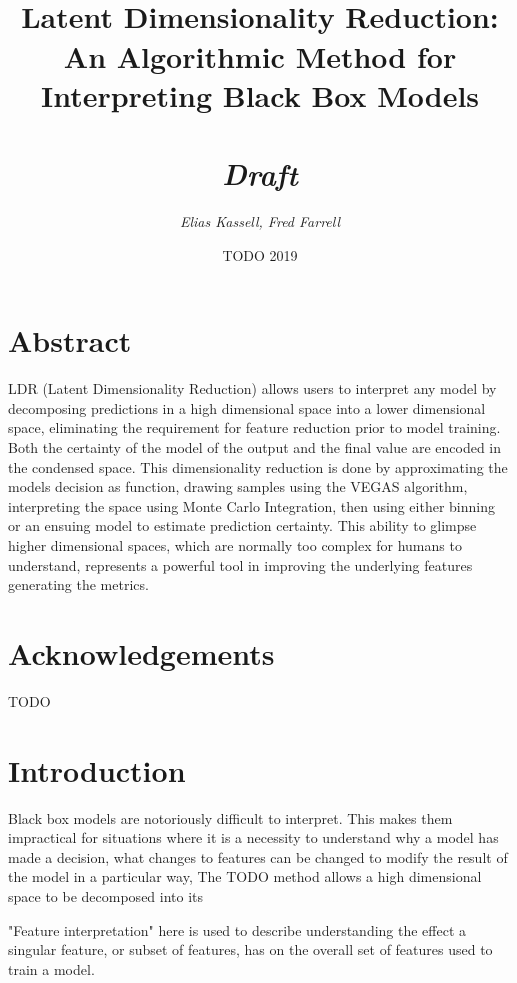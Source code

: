 \documentclass[a4paperpaper,twocolumn]{article}
\begin{document}
\title{\huge \\Latent Dimensionality Reduction: An Algorithmic Method for Interpreting Black Box Models\\~\\
\Large \emph{Draft}}
\author{\emph{Elias Kassell, Fred Farrell}}
\date{TODO 2019}
\maketitle

\section{Abstract}\label{abstract}

LDR (Latent Dimensionality Reduction) allows users to interpret any model by decomposing predictions in a high dimensional space into a lower dimensional space, eliminating the requirement for feature reduction prior to model training. Both the certainty of the model of the output and the final value are encoded in the condensed space. This dimensionality reduction is done by approximating the models decision as function, drawing samples using the VEGAS algorithm, interpreting the space using Monte Carlo Integration, then using either binning or an ensuing model to estimate prediction certainty. This ability to glimpse higher dimensional spaces, which are normally too complex for humans to understand, represents a powerful tool in improving the underlying features generating the metrics.

\section*{Acknowledgements}

TODO

\section{Introduction}\label{Introduction}

Black box models are notoriously difficult to interpret. This makes them impractical for situations where it is a necessity to understand why a model has made a decision, what changes to features can be changed to modify the result of the model in a particular way,  The TODO method allows a high dimensional space to be decomposed into its 

"Feature interpretation" here is used to describe understanding the effect a singular feature, or subset of features, has on the overall set of features used to train a model.
\end{document}
